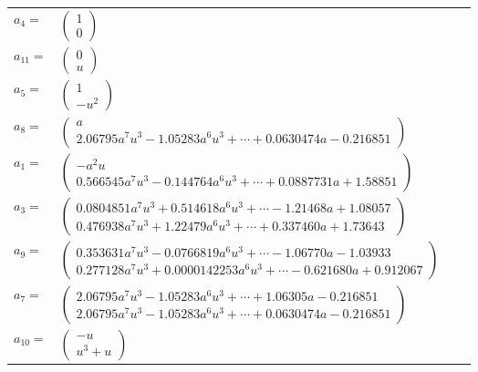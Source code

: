 \documentclass[1p]{elsarticle_modified}
\theoremstyle{definition}
\begin{document}
\begin{tabular}{m{7pt} m{180pt} m{7pt} m{180pt} }
\flushright $a_{4}=$&$\begin{pmatrix}1\\0\end{pmatrix}$ \\
\flushright $a_{11}=$&$\begin{pmatrix}0\\u\end{pmatrix}$ \\
\flushright $a_{5}=$&$\begin{pmatrix}1\\- u^2\end{pmatrix}$ \\
\flushright $a_{8}=$&$\begin{pmatrix}a\\2.06795 a^{7} u^{3}-1.05283 a^{6} u^{3}+\cdots+0.0630474 a-0.216851\end{pmatrix}$ \\
\flushright $a_{1}=$&$\begin{pmatrix}- a^2 u\\0.566545 a^{7} u^{3}-0.144764 a^{6} u^{3}+\cdots+0.0887731 a+1.58851\end{pmatrix}$ \\
\flushright $a_{3}=$&$\begin{pmatrix}0.0804851 a^{7} u^{3}+0.514618 a^{6} u^{3}+\cdots-1.21468 a+1.08057\\0.476938 a^{7} u^{3}+1.22479 a^{6} u^{3}+\cdots+0.337460 a+1.73643\end{pmatrix}$ \\
\flushright $a_{9}=$&$\begin{pmatrix}0.353631 a^{7} u^{3}-0.0766819 a^{6} u^{3}+\cdots-1.06770 a-1.03933\\0.277128 a^{7} u^{3}+0.0000142253 a^{6} u^{3}+\cdots-0.621680 a+0.912067\end{pmatrix}$ \\
\flushright $a_{7}=$&$\begin{pmatrix}2.06795 a^{7} u^{3}-1.05283 a^{6} u^{3}+\cdots+1.06305 a-0.216851\\2.06795 a^{7} u^{3}-1.05283 a^{6} u^{3}+\cdots+0.0630474 a-0.216851\end{pmatrix}$ \\
\flushright $a_{10}=$&$\begin{pmatrix}- u\\u^3+u\end{pmatrix}$ \\

\end{tabular}
\end{document}
